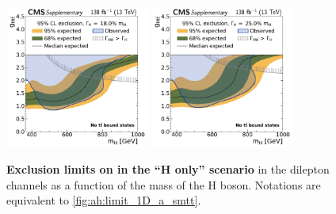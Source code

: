 \begin{figure}[!ph]
    \\
    \includegraphics[width=0.42\textwidth]{figures/ah/lim1D/smtt/ll/H_limit_w18p0_g-scan.pdf}%
    \hspace*{0.05\textwidth}%
    \includegraphics[width=0.42\textwidth]{figures/ah/lim1D/smtt/ll/H_limit_w25p0_g-scan.pdf}
    \caption{%
        \textbf{Exclusion limits on \gHtt in the ``H only'' scenario} in the dilepton channels as a function of the mass of the H boson. Notations are equivalent to \cref{fig:ah:limit_1D_a_smtt}.
    }
    \label{fig:ah:limit_1D_h_smtt}
\end{figure}

